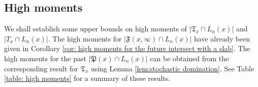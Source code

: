\documentclass[12pt]{article}
\newtheorem{conj}[theorem]{Conjecture}
\numberwithin{equation}{section}
\newcommand{\1}{\mathbf{1}}
\begin{document}
%
%
%
%
%
%
%
%
%
%
%
%
% 
% 
 
 
 
 
 
 
 
 
 
 
 
 
 
 
 
 
 
 \subsection{High moments}

 

 
 
 
 
 

 
 We shall establish some upper bounds  on high moments of $|\mathfrak{T}_x\cap L_n(x)|$ and $|T_x\cap L_n(x)|$. The high moments for $|\mathfrak{F}(x,\infty)\cap L_n(x)|$ have already been given in Corollary \ref{cor: high moments for the future intersect with a slab}. The high moments for the past $|\mathfrak{P}(x)\cap L_n(x)|$ can be obtained from the corresponding result for $\mathfrak{T}_x$ using Lemma \ref{lem:stochastic domination}.  See Table \ref{table: high moments} for a summary of these results.
 
\end{document}
